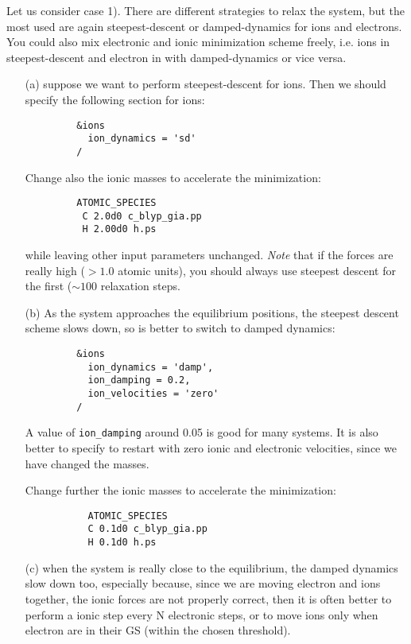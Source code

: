 \documentclass[12pt,a4paper]{article}
\begin{document}
Let us consider case 1). There are 
different strategies to relax the system, but the most used 
are again steepest-descent or damped-dynamics for ions and electrons. 
You could also mix electronic and ionic minimization scheme freely, 
i.e. ions in steepest-descent and electron in with damped-dynamics or vice versa.
\begin{itemize}    
\item[(a)] suppose we want to perform steepest-descent for ions. Then we should specify 
the following section for ions:
\begin{verbatim} 
         &ions
           ion_dynamics = 'sd'
         /
\end{verbatim} 
Change also the ionic masses to accelerate the minimization:
\begin{verbatim} 
         ATOMIC_SPECIES
          C 2.0d0 c_blyp_gia.pp
          H 2.00d0 h.ps
\end{verbatim} 
while leaving other input parameters unchanged.
{\em Note} that if the forces are really high ($> 1.0$ atomic units), you
should always use steepest descent for the first ($\sim 100$
relaxation steps. 
\item[(b)] As the system approaches the equilibrium positions, the steepest 
descent scheme slows down, so is better to switch to damped dynamics:
\begin{verbatim} 
         &ions
           ion_dynamics = 'damp',
           ion_damping = 0.2,
           ion_velocities = 'zero'
         /
\end{verbatim}
A  value of \texttt{ion\_damping} around 0.05 is good for many systems. 
It is also better to specify to restart with zero ionic and electronic 
velocities, since we have changed the masses.
    
Change further the ionic masses to accelerate the minimization:
\begin{verbatim} 
           ATOMIC_SPECIES
           C 0.1d0 c_blyp_gia.pp
           H 0.1d0 h.ps
\end{verbatim}
\item[(c)] when the system is really close to the equilibrium, the damped dynamics 
slow down too, especially because, since we are moving electron and ions 
together, the ionic forces are not properly correct, then it is often better 
to perform a ionic step every N electronic steps, or to move ions only when
electron are in their GS (within the chosen threshold).
    

\end{itemize}
\end{document}
